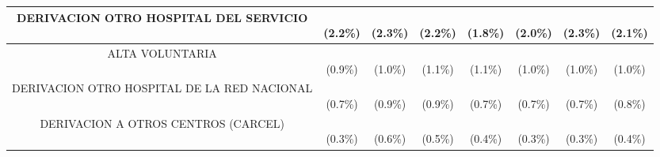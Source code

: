 \begin{table}[htbp]
\begin{tabular}{|c|c|c|c|c|c|c|c|}
\parbox[t]{4.0cm}{\raggedright DERIVACION OTRO HOSPITAL DEL SERVICIO} & \parbox[t]{1.2cm}{\\(2.2\%)} & \parbox[t]{1.2cm}{\\(2.3\%)} & \parbox[t]{1.2cm}{\\(2.2\%)} & \parbox[t]{1.2cm}{\\(1.8\%)} & \parbox[t]{1.2cm}{\\(2.0\%)} & \parbox[t]{1.2cm}{\\(2.3\%)} & \parbox[t]{1.6cm}{\\(2.1\%)} \\ \hline
\parbox[t]{4.0cm}{\raggedright ALTA VOLUNTARIA} & \parbox[t]{1.2cm}{\\(0.9\%)} & \parbox[t]{1.2cm}{\\(1.0\%)} & \parbox[t]{1.2cm}{\\(1.1\%)} & \parbox[t]{1.2cm}{\\(1.1\%)} & \parbox[t]{1.2cm}{\\(1.0\%)} & \parbox[t]{1.2cm}{\\(1.0\%)} & \parbox[t]{1.6cm}{\\(1.0\%)} \\ \hline
\parbox[t]{4.0cm}{\raggedright DERIVACION OTRO HOSPITAL DE LA RED NACIONAL} & \parbox[t]{1.2cm}{\\(0.7\%)} & \parbox[t]{1.2cm}{\\(0.9\%)} & \parbox[t]{1.2cm}{\\(0.9\%)} & \parbox[t]{1.2cm}{\\(0.7\%)} & \parbox[t]{1.2cm}{\\(0.7\%)} & \parbox[t]{1.2cm}{\\(0.7\%)} & \parbox[t]{1.6cm}{\\(0.8\%)} \\ \hline
\parbox[t]{4.0cm}{\raggedright DERIVACION A OTROS CENTROS (CARCEL)} & \parbox[t]{1.2cm}{\\(0.3\%)} & \parbox[t]{1.2cm}{\\(0.6\%)} & \parbox[t]{1.2cm}{\\(0.5\%)} & \parbox[t]{1.2cm}{\\(0.4\%)} & \parbox[t]{1.2cm}{\\(0.3\%)} & \parbox[t]{1.2cm}{\\(0.3\%)} & \parbox[t]{1.6cm}{\\(0.4\%)} \\ \hline

\end{tabular}
\end{table}
